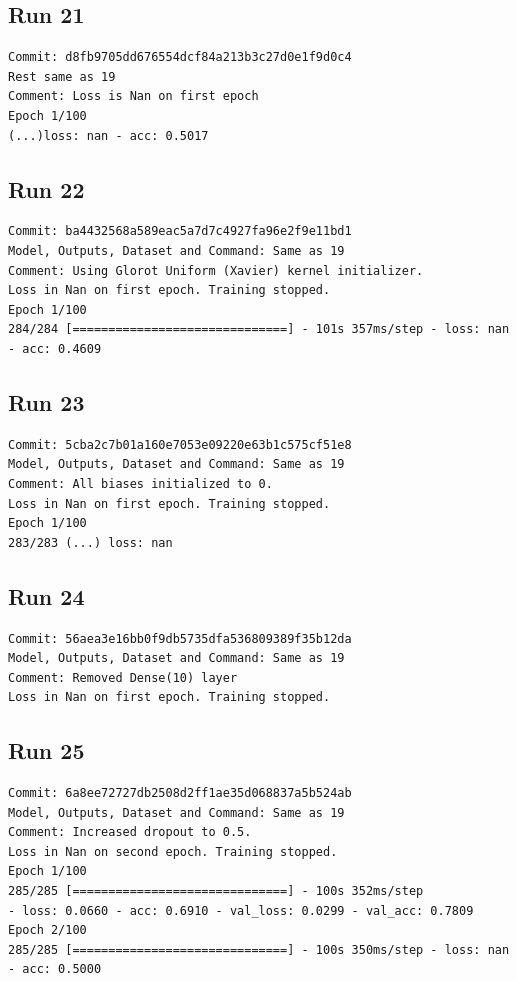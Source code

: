 \subsection{Run 21}
\begin{verbatim}
Commit: d8fb9705dd676554dcf84a213b3c27d0e1f9d0c4 
Rest same as 19
Comment: Loss is Nan on first epoch
Epoch 1/100
(...)loss: nan - acc: 0.5017
\end{verbatim}

\subsection{Run 22}
\begin{verbatim}
Commit: ba4432568a589eac5a7d7c4927fa96e2f9e11bd1
Model, Outputs, Dataset and Command: Same as 19
Comment: Using Glorot Uniform (Xavier) kernel initializer.
Loss in Nan on first epoch. Training stopped.
Epoch 1/100
284/284 [==============================] - 101s 357ms/step - loss: nan 
- acc: 0.4609
\end{verbatim}

\subsection{Run 23}
\begin{verbatim}
Commit: 5cba2c7b01a160e7053e09220e63b1c575cf51e8  
Model, Outputs, Dataset and Command: Same as 19
Comment: All biases initialized to 0.
Loss in Nan on first epoch. Training stopped.
Epoch 1/100
283/283 (...) loss: nan 
\end{verbatim}

\subsection{Run 24}
\begin{verbatim}
Commit: 56aea3e16bb0f9db5735dfa536809389f35b12da  
Model, Outputs, Dataset and Command: Same as 19
Comment: Removed Dense(10) layer
Loss in Nan on first epoch. Training stopped.
\end{verbatim}

\subsection{Run 25}
\begin{verbatim}
Commit: 6a8ee72727db2508d2ff1ae35d068837a5b524ab  
Model, Outputs, Dataset and Command: Same as 19
Comment: Increased dropout to 0.5.
Loss in Nan on second epoch. Training stopped.
Epoch 1/100
285/285 [==============================] - 100s 352ms/step 
- loss: 0.0660 - acc: 0.6910 - val_loss: 0.0299 - val_acc: 0.7809
Epoch 2/100
285/285 [==============================] - 100s 350ms/step - loss: nan 
- acc: 0.5000
\end{verbatim}

